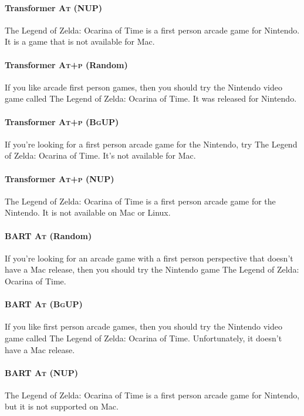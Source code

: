 \paragraph{Transformer \textsc{At} (NUP)}
The Legend of Zelda: Ocarina of Time is a first person arcade game for Nintendo. It is a game that is not available for Mac.

\paragraph{Transformer \textsc{At+p} (Random)}
If you like arcade first person games, then you should try the Nintendo video game called The Legend of Zelda: Ocarina of Time. It was released for Nintendo.

\paragraph{Transformer \textsc{At+p (BgUP)}}
If you're looking for a first person arcade game for the Nintendo, try The Legend of Zelda: Ocarina of Time. It's not available for Mac.

\paragraph{Transformer \textsc{At+p} (NUP)}
The Legend of Zelda: Ocarina of Time is a first person arcade game for the Nintendo. It is not available on Mac or Linux.

\paragraph{BART \textsc{At} (Random)}
If you're looking for an arcade game with a first person perspective that doesn't have a Mac release, then you should try the Nintendo game The Legend of Zelda: Ocarina of Time.

\paragraph{BART \textsc{At (BgUP)}}
If you like first person arcade games, then you should try the Nintendo video game called The Legend of Zelda: Ocarina of Time. Unfortunately, it doesn't have
a Mac release.

\paragraph{BART \textsc{At} (NUP)}
The Legend of Zelda: Ocarina of Time is a first person arcade game for Nintendo, but it is not supported on Mac.

